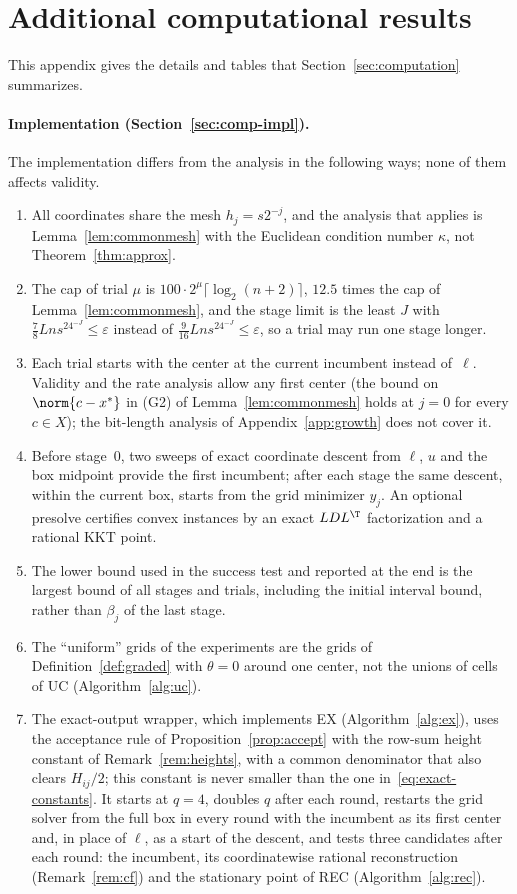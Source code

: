 \section{Additional computational results}\label{app:computation}

This appendix gives the details and tables that Section~\ref{sec:computation}
summarizes.

\paragraph{Implementation (Section~\ref{sec:comp-impl}).}
The implementation differs from the analysis in the following ways; none of
them affects validity.
\begin{enumerate}[label=(\alph*)]
\item All coordinates share the mesh $h_j=s2^{-j}$, and the analysis that
applies is Lemma~\ref{lem:commonmesh} with the Euclidean condition number
$\kappa$, not Theorem~\ref{thm:approx}.
\item The cap of trial $\mu$ is $100\cdot2^\mu\lceil\log_2(n+2)\rceil$,
$12.5$ times the cap of Lemma~\ref{lem:commonmesh}, and the stage limit is the
least $J$ with $\frac78Lns^24^{-J}\le\varepsilon$ instead of
$\frac9{16}Lns^24^{-J}\le\varepsilon$, so a trial may run one stage longer.
\item Each trial starts with the center at the current incumbent instead
of~$\ell$. Validity and the rate analysis allow any first center (the bound
on $\norm{c-x^*}$ in (G2) of Lemma~\ref{lem:commonmesh} holds at $j=0$ for
every $c\in X$); the bit-length analysis of Appendix~\ref{app:growth} does
not cover it.
\item Before stage~$0$, two sweeps of exact coordinate descent from $\ell$,
$u$ and the box midpoint provide the first incumbent; after each stage the
same descent, within the current box, starts from the grid minimizer $y_j$.
An optional presolve certifies convex instances by an exact $LDL^\T$
factorization and a rational KKT point.
\item The lower bound used in the success test and reported at the end is the
largest bound of all stages and trials, including the initial interval bound,
rather than $\beta_j$ of the last stage.
\item The ``uniform'' grids of the experiments are the grids of
Definition~\ref{def:graded} with $\theta=0$ around one center, not the unions
of cells of UC (Algorithm~\ref{alg:uc}).
\item The exact-output wrapper, which implements EX (Algorithm~\ref{alg:ex}),
uses the acceptance rule of Proposition~\ref{prop:accept} with the row-sum
height constant of Remark~\ref{rem:heights}, with a common denominator that
also clears $H_{ij}/2$; this constant is never smaller than the one
in~\eqref{eq:exact-constants}. It starts at $q=4$, doubles $q$ after each
round, restarts the grid solver from the full box in every round with the
incumbent as its first center and, in place of $\ell$, as a start of the
descent, and tests three candidates after each round: the incumbent, its
coordinatewise rational reconstruction (Remark~\ref{rem:cf}) and the
stationary point of REC (Algorithm~\ref{alg:rec}).
\end{enumerate}
